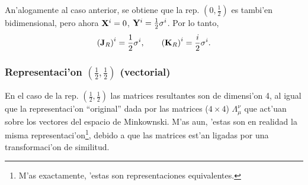 An'alogamente al caso anterior, se obtiene que la rep. $(0,\frac{1}{2})$
es tambi'en bidimensional, pero ahora ${\bf X}^{i}=0$, ${\bf Y}^{i}=\frac{%
1}{2}{\bf \sigma }^{i}$. Por lo tanto, 
\begin{equation}
({\bf J}_{R}{\bf )}^{i}=\frac{1}{2}{\bf \sigma }^{i},\qquad ({\bf K}_{R}{\bf %
)}^{i}=\frac{i}{2}{\bf \sigma }^{i}. 
\end{equation}

\subsubsection{Representaci'on $(\frac{1}{2},\frac{1}{2})$ (vectorial)%
\label{vect}}

En el caso de la rep. $(\frac{1}{2},\frac{1}{2})$ las matrices resultantes
son de dimensi'on 4, al igual que la representaci'on ``original'' dada
por las matrices ($4\times 4$) $\Lambda _{\mu }^{\nu }$ que act'uan sobre
los vectores del espacio de Minkownski. M'as aun, 'estas son en
realidad la misma representaci'on\footnote{%
M'as exactamente, 'estas son representaciones equivalentes.}, debido a
que las matrices est'an ligadas por una transformaci'on de similitud.

